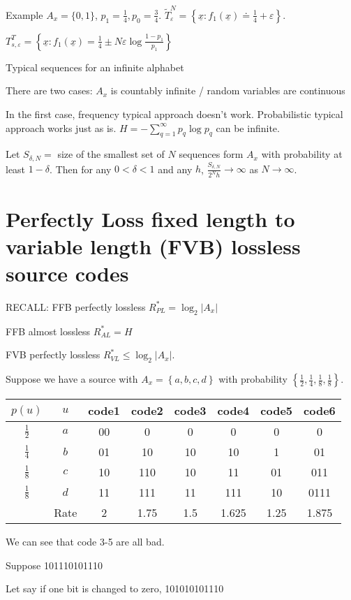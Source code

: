 \documentclass{report}
\newcommand{\set}[1]{\left\lbrace #1 \right\rbrace}
\theoremstyle{definition}
\theoremstyle{remark}
\numberwithin{equation}{section}
\begin{document}
Example $A_x = \{0, 1\}$, $p_1 = \frac{1}{4}, p_0 = \frac{3}{4}$. $\tilde{T}_\varepsilon^N = \set{\underline{x}: f_1(\underline{x}) \doteq \frac{1}{4} + \varepsilon}$.

$T_{s, \varepsilon}^T = \set{\underline{x}: f_1(\underline{x}) = \frac{1}{4} \pm N\varepsilon\log\frac{1 - p_1}{p_1}}$


Typical sequences for an infinite alphabet

There are two cases:
$A_x$ is countably infinite / random variables are continuous

In the first case, frequency typical approach doesn't work. Probabilistic typical approach works just as is. $H = -\sum_{q=1}^\infty p_q \log p_q$ can be infinite.

Let $S_{\delta, N} = $ size of the smallest set of $N$ sequences form $A_x$ with probability at least $1-\delta$. Then for any $0 < \delta < 1$ and any $h$, $\frac{S_{\delta, N}}{2^Nh} \to \infty$ as $N \to \infty$.

\section{Perfectly Loss fixed length to variable length (FVB) lossless source codes}

RECALL: FFB perfectly lossless $R^*_{PL} = \log_2|A_x|$

FFB almost lossless $R^*_{AL} = H$

FVB perfectly lossless $R^*_{VL} \leq \log_2|A_x|$.

Suppose we have a source with $A_x = \set{a,b,c,d}$ with probability $\set{\frac{1}{2},\frac{1}{4},\frac{1}{8},\frac{1}{8}}$.

\begin{tabular}{cc|cccccc}
  $p(u)$ & $u$ & code1 & code2 & code3 & code4 & code5 & code6\\ \hline
  $\frac{1}{2}$ & $a$ & 00 & 0 & 0 & 0 & 0 & 0 \\ 
  $\frac{1}{4}$ & $b$ & 01 & 10 & 10 & 10 & 1 & 01 \\ 
  $\frac{1}{8}$ & $c$ & 10 & 110 & 10 & 11 & 01 & 011\\
  $\frac{1}{8}$ & $d$ & 11 & 111& 11 & 111 & 10 & 0111\\ \hline
  & Rate & 2 & 1.75 & 1.5 & 1.625 & 1.25 & 1.875
\end{tabular}
We can see that code 3-5 are all bad.

Suppose 101110101110

Let say if one bit is changed to zero, 101010101110
\end{document}
